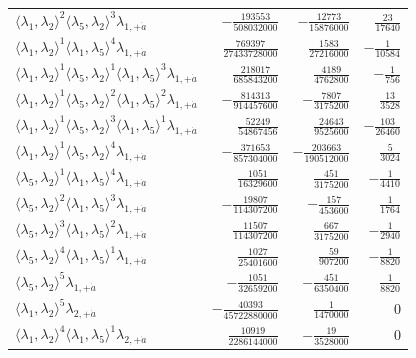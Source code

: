 \begin{longtable}{@{}lrrr@{}}
$\langle\lambda_1,\lambda_2\rangle^{2}\langle\lambda_5,\lambda_2\rangle^{3}\lambda_{1,+\dot a}$ & $-\frac{193553}{508032000}$ & $-\frac{12773}{15876000}$ & $\frac{23}{17640}$ \\
$\langle\lambda_1,\lambda_2\rangle^{1}\langle\lambda_1,\lambda_5\rangle^{4}\lambda_{1,+\dot a}$ & $\frac{769397}{27433728000}$ & $\frac{1583}{27216000}$ & $-\frac{1}{10584}$ \\
$\langle\lambda_1,\lambda_2\rangle^{1}\langle\lambda_5,\lambda_2\rangle^{1}\langle\lambda_1,\lambda_5\rangle^{3}\lambda_{1,+\dot a}$ & $\frac{218017}{685843200}$ & $\frac{4189}{4762800}$ & $-\frac{1}{756}$ \\
$\langle\lambda_1,\lambda_2\rangle^{1}\langle\lambda_5,\lambda_2\rangle^{2}\langle\lambda_1,\lambda_5\rangle^{2}\lambda_{1,+\dot a}$ & $-\frac{814313}{914457600}$ & $-\frac{7807}{3175200}$ & $\frac{13}{3528}$ \\
$\langle\lambda_1,\lambda_2\rangle^{1}\langle\lambda_5,\lambda_2\rangle^{3}\langle\lambda_1,\lambda_5\rangle^{1}\lambda_{1,+\dot a}$ & $\frac{52249}{54867456}$ & $\frac{24643}{9525600}$ & $-\frac{103}{26460}$ \\
$\langle\lambda_1,\lambda_2\rangle^{1}\langle\lambda_5,\lambda_2\rangle^{4}\lambda_{1,+\dot a}$ & $-\frac{371653}{857304000}$ & $-\frac{203663}{190512000}$ & $\frac{5}{3024}$ \\
$\langle\lambda_5,\lambda_2\rangle^{1}\langle\lambda_1,\lambda_5\rangle^{4}\lambda_{1,+\dot a}$ & $\frac{1051}{16329600}$ & $\frac{451}{3175200}$ & $-\frac{1}{4410}$ \\
$\langle\lambda_5,\lambda_2\rangle^{2}\langle\lambda_1,\lambda_5\rangle^{3}\lambda_{1,+\dot a}$ & $-\frac{19807}{114307200}$ & $-\frac{157}{453600}$ & $\frac{1}{1764}$ \\
$\langle\lambda_5,\lambda_2\rangle^{3}\langle\lambda_1,\lambda_5\rangle^{2}\lambda_{1,+\dot a}$ & $\frac{11507}{114307200}$ & $\frac{667}{3175200}$ & $-\frac{1}{2940}$ \\
$\langle\lambda_5,\lambda_2\rangle^{4}\langle\lambda_1,\lambda_5\rangle^{1}\lambda_{1,+\dot a}$ & $\frac{1027}{25401600}$ & $\frac{59}{907200}$ & $-\frac{1}{8820}$ \\
$\langle\lambda_5,\lambda_2\rangle^{5}\lambda_{1,+\dot a}$ & $-\frac{1051}{32659200}$ & $-\frac{451}{6350400}$ & $\frac{1}{8820}$ \\
$\langle\lambda_1,\lambda_2\rangle^{5}\lambda_{2,+\dot a}$ & $-\frac{40393}{45722880000}$ & $\frac{1}{1470000}$ & $0$ \\
$\langle\lambda_1,\lambda_2\rangle^{4}\langle\lambda_1,\lambda_5\rangle^{1}\lambda_{2,+\dot a}$ & $\frac{10919}{2286144000}$ & $-\frac{19}{3528000}$ & $0$ \\

\end{longtable}
